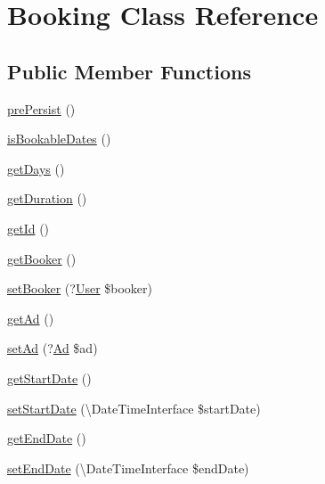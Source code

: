 \hypertarget{class_app_1_1_entity_1_1_booking}{}\section{Booking Class Reference}
\label{class_app_1_1_entity_1_1_booking}
\subsection*{Public Member Functions}
\begin{DoxyCompactItemize}
\item 
\mbox{\hyperlink{class_app_1_1_entity_1_1_booking_aaf176bf05676d9145be294568feae3e5}{pre\+Persist}} ()
\item 
\mbox{\hyperlink{class_app_1_1_entity_1_1_booking_a26b540da1b354196867927f9da66a077}{is\+Bookable\+Dates}} ()
\item 
\mbox{\hyperlink{class_app_1_1_entity_1_1_booking_a1d5ac608362aa00b66cf67650d2f2530}{get\+Days}} ()
\item 
\mbox{\hyperlink{class_app_1_1_entity_1_1_booking_ab46fe3d2750728c84bd71ae1bfd08ee8}{get\+Duration}} ()
\item 
\mbox{\hyperlink{class_app_1_1_entity_1_1_booking_a12251d0c022e9e21c137a105ff683f13}{get\+Id}} ()
\item 
\mbox{\hyperlink{class_app_1_1_entity_1_1_booking_abaa51ff7dc64b4adf28092404a09f091}{get\+Booker}} ()
\item 
\mbox{\hyperlink{class_app_1_1_entity_1_1_booking_afa4194d843430923260288b8172fe893}{set\+Booker}} (?\mbox{\hyperlink{class_app_1_1_entity_1_1_user}{User}} \$booker)
\item 
\mbox{\hyperlink{class_app_1_1_entity_1_1_booking_acbaadb0b5b6f7e8ad6a9a0854e7fbf4c}{get\+Ad}} ()
\item 
\mbox{\hyperlink{class_app_1_1_entity_1_1_booking_a3f7c05734d0d1dbedb3ac722e171cc12}{set\+Ad}} (?\mbox{\hyperlink{class_app_1_1_entity_1_1_ad}{Ad}} \$ad)
\item 
\mbox{\hyperlink{class_app_1_1_entity_1_1_booking_a0c44cbed4e674365b58324212de2e05e}{get\+Start\+Date}} ()
\item 
\mbox{\hyperlink{class_app_1_1_entity_1_1_booking_a7aa58871c611fdb3e63186359f9c6d28}{set\+Start\+Date}} (\textbackslash{}Date\+Time\+Interface \$start\+Date)
\item 
\mbox{\hyperlink{class_app_1_1_entity_1_1_booking_a5776ab464f7733284408dc2fa5e907e9}{get\+End\+Date}} ()
\item 
\mbox{\hyperlink{class_app_1_1_entity_1_1_booking_a881b5c57e493b646e6618e219562fe2c}{set\+End\+Date}} (\textbackslash{}Date\+Time\+Interface \$end\+Date)

\end{DoxyCompactItemize}
